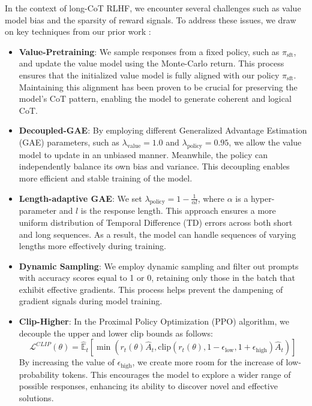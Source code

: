 In the context of long-CoT RLHF, we encounter several challenges such as value model bias and the sparsity of reward signals. To address these issues, we draw on key techniques from our prior work \cite{yuan2025s, dapo, vapo}:
\begin{itemize}
    \item \textbf{Value-Pretraining}: We sample responses from a fixed policy, such as $\pi_{\text{sft}}$, and update the value model using the Monte-Carlo return. This process ensures that the initialized value model is fully aligned with our policy $\pi_{\text{sft}}$. Maintaining this alignment has been proven to be crucial for preserving the model's CoT pattern, enabling the model to generate coherent and logical CoT.
    \item \textbf{Decoupled-GAE}: By employing different Generalized Advantage Estimation (GAE) parameters, such as $\lambda_{\text{value}} = 1.0$ and $\lambda_{\text{policy}} = 0.95$, we allow the value model to update in an unbiased manner. Meanwhile, the policy can independently balance its own bias and variance. This decoupling enables more efficient and stable training of the model.
    \item \textbf{Length-adaptive GAE}: We set $\lambda_{\text{policy}} = 1-\frac{1}{\alpha l}$, where $\alpha$ is a hyper-parameter and $l$ is the response length. This approach ensures a more uniform distribution of Temporal Difference (TD) errors across both short and long sequences. As a result, the model can handle sequences of varying lengths more effectively during training.
    \item \textbf{Dynamic Sampling}: We employ dynamic sampling and filter out prompts with accuracy scores equal to 1 or 0, retaining only those in the batch that exhibit effective gradients. This process helps prevent the dampening of gradient signals during model training.
    \item \textbf{Clip-Higher}: In the Proximal Policy Optimization (PPO) algorithm, we decouple the upper and lower clip bounds as follows:
    \begin{equation}
\mathcal{L}^{CLIP}(\theta)=\hat{\mathbb{E}}_t\left[\min\left(r_t(\theta)\hat{A}_t,\text{clip}(r_t(\theta), 1-\epsilon_\text{low}, 1+\epsilon_\text{high})\hat{A}_t\right)\right]
\end{equation}
By increasing the value of $\epsilon_\text{high}$, we create more room for the increase of low-probability tokens. This encourages the model to explore a wider range of possible responses, enhancing its ability to discover novel and effective solutions.

\end{itemize}
